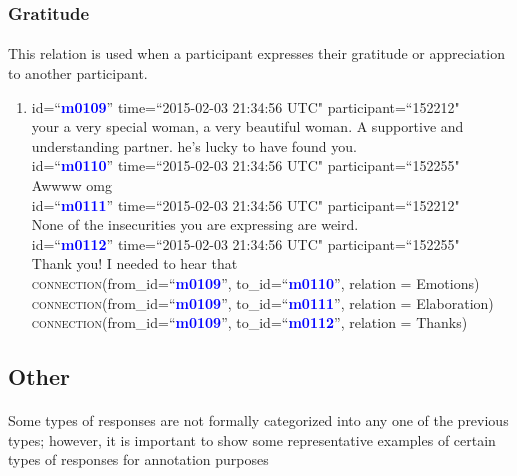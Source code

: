 \documentclass{article}
\begin{document}
\subsubsection{Gratitude}
\paragraph{}
This relation is used when a participant expresses their gratitude or appreciation to another participant.
\begin{enumerate}[resume]
\item id=``\textbf{\textcolor{blue}{m0109}}'' time=``2015-02-03 21:34:56 UTC" participant=``152212"\\
your a very special woman, a very beautiful woman. A supportive and understanding partner. he’s lucky to have found you.\\
id=``\textbf{\textcolor{blue}{m0110}}'' time=``2015-02-03 21:34:56 UTC" participant=``152255"\\
Awwww omg \\
id=``\textbf{\textcolor{blue}{m0111}}'' time=``2015-02-03 21:34:56 UTC" participant=``152212"\\
None of the insecurities you are expressing are weird. \\
id=``\textbf{\textcolor{blue}{m0112}}'' time=``2015-02-03 21:34:56 UTC" participant=``152255"\\
Thank you! I needed to hear that\\
\textsc{connection}(from\_id=``\textbf{\textcolor{blue}{m0109}}'', to\_id=``\textbf{\textcolor{blue}{m0110}}'', relation = Emotions)\\
\textsc{connection}(from\_id=``\textbf{\textcolor{blue}{m0109}}'', to\_id=``\textbf{\textcolor{blue}{m0111}}'', relation = Elaboration)\\
\textsc{connection}(from\_id=``\textbf{\textcolor{blue}{m0109}}'', to\_id=``\textbf{\textcolor{blue}{m0112}}'', relation = Thanks)\\
\end{enumerate}


\subsection{Other}
\paragraph{}
Some types of responses are not formally categorized into any one of the previous types; however, it is important to show some representative examples of certain types of responses for annotation purposes
\end{document}
